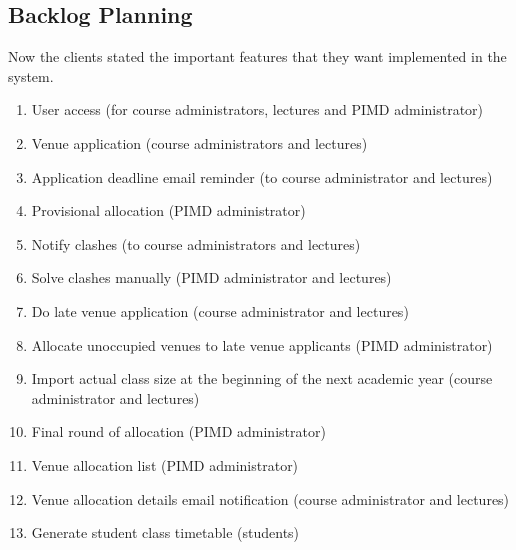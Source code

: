 \documentclass[11pt]{article}
\begin{document}
\subsection{Backlog Planning}
Now the clients stated the important features that they want implemented in the system.\\
\begin{enumerate}[nosep, label=\textendash]
	\item User access (for course administrators, lectures and PIMD administrator)
	\item Venue application (course administrators and lectures)
	\item Application deadline email reminder (to course administrator and lectures)
	\item Provisional allocation (PIMD administrator)
	\item Notify clashes (to course administrators and lectures)
	\item Solve clashes manually (PIMD administrator and lectures)
	\item Do late venue application (course administrator and lectures)
	\item Allocate unoccupied venues to late venue applicants (PIMD administrator)
	\item Import actual class size at the beginning of the next academic year (course administrator and lectures)
	\item Final round of allocation (PIMD administrator)
	\item Venue allocation list (PIMD administrator)
	\item Venue allocation details email notification (course administrator and lectures) 
	\item Generate student class timetable (students)
\end{enumerate}
\end{document}
